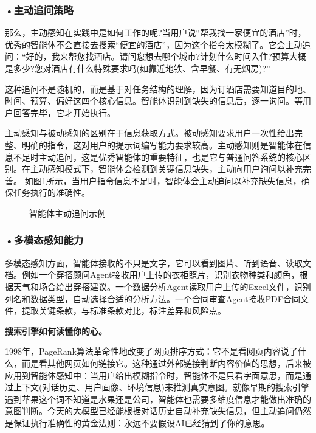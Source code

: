 \subsubsection*{\textbf{•主动追问策略}}
那么，主动感知在实践中是如何工作的呢?当用户说“帮我找一家便宜的酒店”时，优秀的智能体不会直接去搜索“便宜的酒店”，因为这个指令太模糊了。它会主动追问：“好的，我来帮您找酒店。请问您想去哪个城市?计划什么时间入住?预算大概是多少?您对酒店有什么特殊要求吗(如靠近地铁、含早餐、有无烟房)?”


这种追问不是随机的，而是基于对任务结构的理解，因为订酒店需要知道目的地、时间、预算、偏好这四个核心信息。智能体识别到缺失的信息后，逐一询问。等用户回答完毕，它才开始执行。

主动感知与被动感知的区别在于信息获取方式。被动感知要求用户一次性给出完整、明确的指令，这对用户的提示词编写能力要求较高。主动感知则是智能体在信息不足时主动追问，这是优秀智能体的重要特征，也是它与普通问答系统的核心区别。在主动感知模式下，智能体会检测到关键信息缺失，主动向用户询问以补充完善。
如图\ref{fig:ch3_3_22}所示，当用户指令信息不足时，智能体会主动追问以补充缺失信息，确保任务执行的准确性。

\begin{figure}[H]
\centering
{}
\caption{智能体主动追问示例}
\label{fig:ch3_3_22}
\end{figure}


\subsubsection*{\textbf{•多模态感知能力}}

多模态感知方面，智能体接收的不只是文字，它可以看到图片、听到语音、读取文档。例如一个穿搭顾问Agent接收用户上传的衣柜照片，识别衣物种类和颜色，根据天气和场合给出穿搭建议。一个数据分析Agent读取用户上传的Excel文件，识别列名和数据类型，自动选择合适的分析方法。一个合同审查Agent接收PDF合同文件，提取关键条款，与标准条款对比，标注差异和风险点。 

\begin{funbox}
\textbf{搜索引擎如何读懂你的心。} 

1998年，PageRank算法革命性地改变了网页排序方式：它不是看网页内容说了什么，而是看其他网页如何链接它。这种通过外部链接判断内容价值的思想，后来被应用到智能体感知中：当用户给出模糊指令时，智能体不是只看字面意思，而是通过上下文(对话历史、用户画像、环境信息)来推测真实意图。就像早期的搜索引擎遇到苹果这个词不知道是水果还是公司，智能体也需要多维度信息才能做出准确的意图判断。今天的大模型已经能根据对话历史自动补充缺失信息，但主动追问仍然是保证执行准确性的黄金法则：永远不要假设AI已经猜到了你的意思。
\end{funbox}




